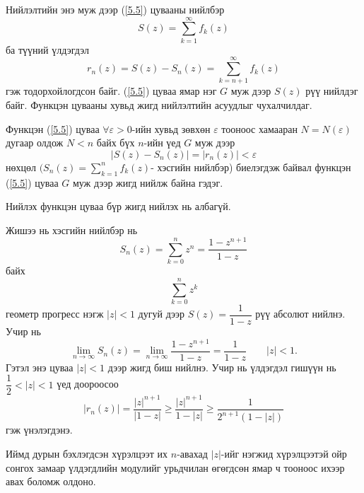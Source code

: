 Нийлэлтийн энэ муж дээр (\ref{5.5}) цувааны нийлбэр
$$S(z)=\sum\limits_{k=1}^\infty f_k(z)$$
ба түүний үлдэгдэл
$$r_n(z)=S(z)-S_n(z)=\sum\limits_{k=n+1}^\infty f_k(z)$$
гэж тодорхойлогдсон байг. (\ref{5.5}) цуваа ямар нэг $G$ муж дээр $S(z)$ рүү нийлдэг байг. Функцэн цувааны хувьд жигд нийлэлтийн асуудлыг чухалчилдаг.
\begin{dfn}
 Функцэн (\ref{5.5}) цуваа $\forall \varepsilon>0$-ийн хувьд зөвхөн $\varepsilon$ тооноос хамааран $N=N(\varepsilon)$ дугаар олдож $N<n$ байх бүх $n$-ийн үед $G$ муж дээр
 $$|S(z)-S_n(z)|=|r_n (z)|<\varepsilon$$
нөхцөл $(S_n(z)=  \sum\limits_{k=1}^n f_k(z)$- хэсгийн нийлбэр) биелэгдэж байвал  функцэн (\ref{5.5}) цуваа $G$ муж дээр жигд нийлж байна гэдэг.
\end{dfn}
Нийлэх функцэн цуваа бүр жигд нийлэх нь албагүй.

Жишээ нь хэсгийн нийлбэр нь
$$S_n(z)=\sum\limits_{k=0}^n z^n=\frac{1-z^{n+1}}{1-z}$$
байх
$$\sum\limits_{k=0}^n z^k$$
геометр прогресс нэгж $|z|<1$ дугуй дээр $S(z)=\dfrac{1}{1-z}$ рүү абсолют нийлнэ. Учир нь
$$\lim\limits_{n\rightarrow \infty} S_n(z)=\lim\limits_{n\rightarrow \infty} \frac{1-z^{n+1}}{1-z}=\frac{1}{1-z}\qquad |z|<1.$$
Гэтэл энэ цуваа $|z|<1$ дээр жигд биш нийлнэ. Учир нь үлдэгдэл гишүүн нь $\dfrac{1}{2}<|z|<1$ үед доороосоо
$$|r_n (z)|=\dfrac{|z|^{n+1}}{|1-z|}\geq \frac{|z|^{n+1}}{1-|z|}\geq \frac{1}{2^{n+1}(1-|z|)}$$
гэж үнэлэгдэнэ.

Иймд дурын бэхлэгдсэн хүрэлцээт их $n$-авахад $|z|$-ийг нэгжид хүрэлцээтэй ойр сонгох замаар үлдэгдлийн модулийг урьдчилан өгөгдсөн ямар ч тооноос ихээр авах боломж олдоно.

